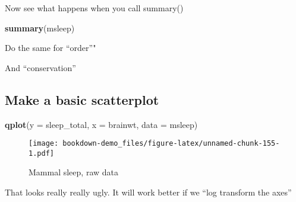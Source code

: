 \documentclass[]{book}
\newenvironment{Shaded}{\begin{snugshade}}{\end{snugshade}}
\newcommand{\KeywordTok}[1]{\textcolor[rgb]{0.13,0.29,0.53}{\textbf{#1}}}
\newcommand{\DataTypeTok}[1]{\textcolor[rgb]{0.13,0.29,0.53}{#1}}
\newcommand{\StringTok}[1]{\textcolor[rgb]{0.31,0.60,0.02}{#1}}
\newcommand{\OperatorTok}[1]{\textcolor[rgb]{0.81,0.36,0.00}{\textbf{#1}}}
\newcommand{\NormalTok}[1]{#1}
\theoremstyle{definition}
\theoremstyle{definition}
\theoremstyle{definition}
\theoremstyle{remark}
\begin{document}
Now see what happens when you call summary()

\begin{Shaded}
\begin{Highlighting}[]
\KeywordTok{summary}\NormalTok{(msleep)}
\end{Highlighting}
\end{Shaded}

Do the same for ``order''"

\begin{Shaded}
\end{Shaded}

And ``conservation''

\begin{Shaded}
\end{Shaded}

\subsection{Make a basic scatterplot}\label{make-a-basic-scatterplot}

\begin{Shaded}
\begin{Highlighting}[]
\KeywordTok{qplot}\NormalTok{(}\DataTypeTok{y =}\NormalTok{ sleep_total,}
      \DataTypeTok{x =}\NormalTok{ brainwt, }
      \DataTypeTok{data =}\NormalTok{ msleep)}
\end{Highlighting}
\end{Shaded}

\begin{figure}
\centering
\texttt{[image: bookdown-demo\_files/figure-latex/unnamed-chunk-155-1.pdf]}
\caption{\label{fig:unnamed-chunk-155}Mammal sleep, raw data}
\end{figure}

That looks really really ugly. It will work better if we ``log transform
the axes''
\end{document}
